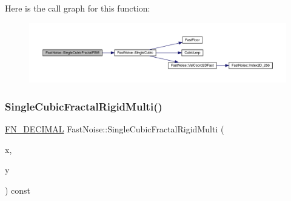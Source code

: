 Here is the call graph for this function\+:
\nopagebreak
\begin{figure}[H]
\begin{center}
\leavevmode
\includegraphics[width=350pt]{d1/dd8/class_fast_noise_a6334e559478fb891e31e305d64c0c31d_cgraph}
\end{center}
\end{figure}
\mbox{\label{class_fast_noise_ae8f66a142a0206d4907a5dab291f4b3d}} 
\subsubsection{\texorpdfstring{Single\+Cubic\+Fractal\+Rigid\+Multi()}{SingleCubicFractalRigidMulti()}\hspace{0.1cm}{\footnotesize\ttfamily [1/2]}}
{\footnotesize\ttfamily \mbox{\hyperlink{_fast_noise_8h_a75a9ef6d2541c4921815b885bfd449c3}{F\+N\+\_\+\+D\+E\+C\+I\+M\+AL}} Fast\+Noise\+::\+Single\+Cubic\+Fractal\+Rigid\+Multi (\begin{DoxyParamCaption}\item[{\mbox{\hyperlink{_fast_noise_8h_a75a9ef6d2541c4921815b885bfd449c3}{F\+N\+\_\+\+D\+E\+C\+I\+M\+AL}}}]{x,  }\item[{\mbox{\hyperlink{_fast_noise_8h_a75a9ef6d2541c4921815b885bfd449c3}{F\+N\+\_\+\+D\+E\+C\+I\+M\+AL}}}]{y }\end{DoxyParamCaption}) const\hspace{0.3cm}{\ttfamily [private]}}

